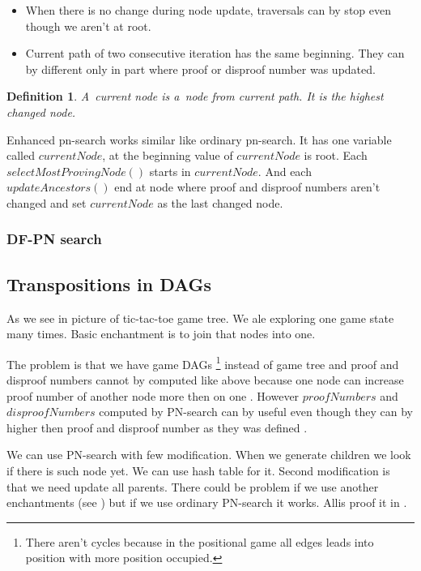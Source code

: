\begin{itemize}
\item When there is no change during node update, traversals can by stop even though we
aren't at root.
\item Current path of two consecutive iteration has the same beginning. They can by different 
only in part where proof or disproof number was updated.
\end{itemize}

\newtheorem*{currentNode}{Definition}	
\begin{currentNode}
A~{\sl current node} is a~node from current path. It is the highest changed node.
\end{currentNode}


Enhanced pn-search works similar like ordinary pn-search. It has one variable
called $currentNode$, at the beginning value of $currentNode$ is root. Each
$selectMostProvingNode()$ starts in $currentNode$. And each $updateAncestors()$
end at node where proof and disproof numbers aren't changed and set
$currentNode$ as the last changed node.

\subsubsection{DF-PN search}


\subsection{Transpositions in DAGs}

As we see in picture  of tic-tac-toe game tree.  We ale exploring one
game state many times. Basic enchantment is to join that nodes into one.

The problem is that we have game DAGs \footnote{There aren't cycles because in the
positional game all edges leads into position with more position occupied.}
instead of game tree and proof and disproof numbers
cannot by computed like above because one node can increase proof number of
another node more then on one . However $proofNumbers$ and $disproofNumbers$
computed by PN-search can by useful even though they can by higher then proof
and disproof number as they was defined . 

We can use PN-search with few modification. When we generate children we look
if there is such node yet. We can use hash table for it. Second modification is
that we need update all parents. There could be problem if we use another
enchantments (see ) but if we use ordinary PN-search it works. Allis
proof it in \cite{allis} .

